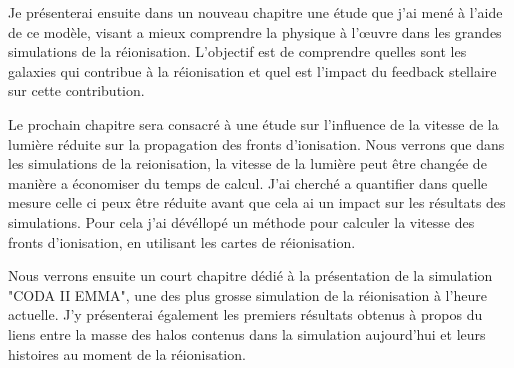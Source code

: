


Je présenterai ensuite dans un nouveau chapitre une étude que j'ai mené à l'aide de ce modèle, visant a mieux comprendre la physique à l'œuvre dans les grandes simulations de la réionisation.
L'objectif est de comprendre quelles sont les galaxies qui contribue à la réionisation et quel est l'impact du feedback stellaire sur cette contribution.

Le prochain chapitre sera consacré à une étude sur l'influence de la vitesse de la lumière réduite sur la propagation des fronts d'ionisation.
Nous verrons que dans les simulations de la reionisation, la vitesse de la lumière peut être changée de manière a économiser du temps de calcul.
J'ai cherché a quantifier dans quelle mesure celle ci peux être réduite avant que cela ai un impact sur les résultats des simulations.
Pour cela j'ai dévéllopé un méthode pour calculer la vitesse des fronts d'ionisation, en utilisant les cartes de réionisation.

Nous verrons ensuite un court chapitre dédié à la présentation de la simulation "CODA II EMMA", une des plus grosse simulation de la réionisation à l'heure actuelle.
J'y présenterai également les premiers résultats obtenus à propos du liens entre la masse des halos contenus dans la simulation aujourd'hui et leurs histoires au moment de la réionisation.




